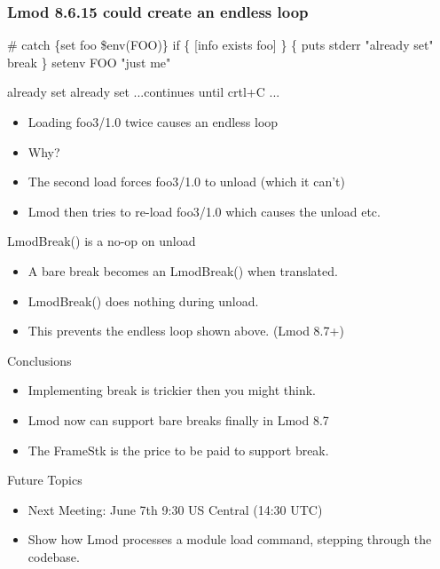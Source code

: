 \documentclass{beamer}
\begin{document}
\begin{frame}[fragile]
    \frametitle{Lmod 8.6.15 could create an endless loop}
 {\small
    \begin{semiverbatim}
#%
catch \{set foo \$env(FOO)\}
if \{ [info exists foo] \} \{
  puts stderr "already set"
  break
\}
setenv FOO "just me"

already set
already set
...continues until crtl+C ...
    \end{semiverbatim}
}
  \begin{itemize}
    \item Loading foo3/1.0 twice causes an endless loop
    \item Why?
    \item The second load forces foo3/1.0 to unload (which it can't)
    \item Lmod then tries to re-load foo3/1.0 which causes the unload etc.
  \end{itemize}

\end{frame}

\begin{frame}{LmodBreak() is a no-op on unload}
  \begin{itemize}
    \item A bare break becomes an LmodBreak() when translated.
    \item LmodBreak() does nothing during unload.
    \item This prevents the endless loop shown above. (Lmod 8.7+)
  \end{itemize}
\end{frame}

\begin{frame}{Conclusions}
  \begin{itemize}
    \item Implementing break is trickier then you might think.
    \item Lmod now can support bare breaks finally in Lmod 8.7
    \item The FrameStk is the price to be paid to support break.
  \end{itemize}
\end{frame}

\begin{frame}{Future Topics}
  \begin{itemize}
    \item Next Meeting: June 7th 9:30 US Central (14:30 UTC)
    \item Show how Lmod processes a module load command, stepping through the codebase.
  \end{itemize}
\end{frame}
\end{document}

